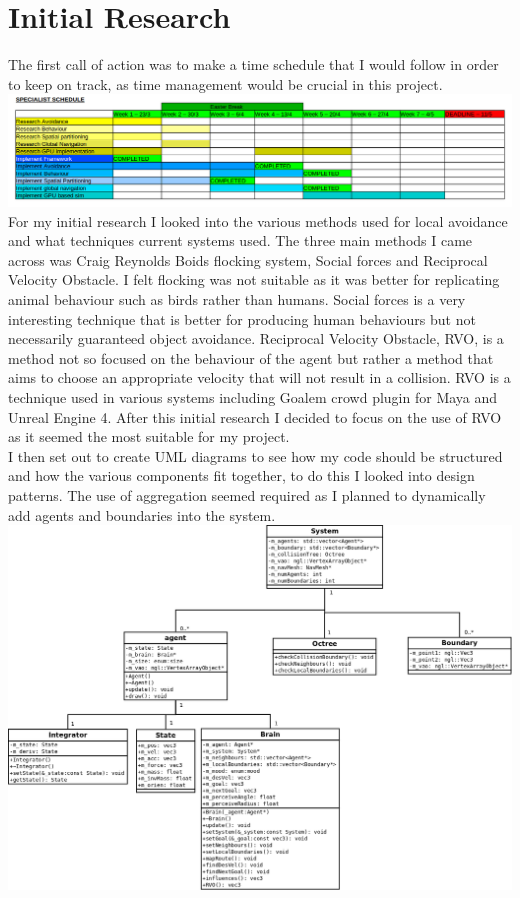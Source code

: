 \documentclass[a4paper,twocolumn]{article}
\begin{document}
\section{Initial Research}
The first call of action was to make a time schedule that I would follow in order to keep on track, as time management would be crucial in this project.
\label{schedule}
\includegraphics[scale=0.2]{../schedule/specialistSchedule.png}
For my initial research I looked into the various methods used for local avoidance and what techniques current systems used. The three main methods I came across was Craig Reynolds Boids flocking system, Social forces and Reciprocal Velocity Obstacle. I felt flocking was not suitable as it was better for replicating animal behaviour such as birds rather than humans. Social forces is a very interesting technique that is better for producing human behaviours but not necessarily guaranteed object avoidance. Reciprocal Velocity Obstacle, RVO, is a method not so focused on the behaviour of the agent but rather a method that aims to choose an appropriate velocity that will not result in a collision. RVO is a technique used in various systems including Goalem crowd plugin for Maya and Unreal Engine 4. After this initial research I decided to focus on the use of RVO as it seemed the most suitable for my project.\\
I then set out to create UML diagrams to see how my code should be structured and how the various components fit together, to do this I looked into design patterns. The use of aggregation seemed required as I planned to dynamically add agents and boundaries into the system.\\
\label{uml diagram}
\includegraphics[scale=0.13]{../umlDiagram/Agent_UML_diagram.png} 
\end{document}
